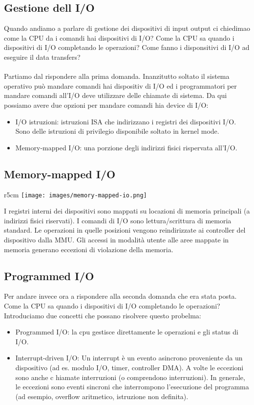 \subsection{Gestione dell I/O}
Quando andiamo a parlare di gestione dei dispositivi di input output ci chiedimao come la CPU da i comandi 
hai dispositivi di I/O? Come la CPU sa quando i dispositivi di I/O completando le operazioni? Come fanno i 
disponsitivi di I/O ad eseguire il data transfers?\\\\
Partiamo dal rispondere alla prima domanda. Inanzitutto soltato il sistema operativo può mandare comandi hai dispositiv
di I/O ed i programmatori per mandare comandi all'I/O deve utilizzare delle chiamate di sistema. Da qui possiamo avere
due opzioni per mandare comandi hia device di I/O:
\begin{itemize}
    \item I/O istruzioni: istruzioni ISA che indirizzano i registri dei dispositivi I/O. Sono delle istruzioni di privilegio disponibile soltato in kernel mode.
    \item Memory-mapped I/O: una porzione degli indirizzi fisici rispervata all'I/O.
\end{itemize}

\subsection{Memory-mapped I/O}
\begin{wrapfigure}{r}{5cm}
    \vspace{-20pt}
    \centering
    \texttt{[image: images/memory-mapped-io.png]}
\end{wrapfigure}
I registri interni dei dispositivi sono mappati su locazioni di memoria principali (a indirizzi fisici riservati). 
I comandi di I/O sono lettura/scrittura di memoria standard. Le operazioni in quelle posizioni vengono reindirizzate ai controller del dispositivo dalla MMU. 
Gli accessi in modalità utente alle aree mappate in memoria generano eccezioni di violazione della memoria.

\subsection{Programmed I/O}
Per andare invece ora a rispondere alla seconda domanda che era stata posta. Come la CPU sa quando i dispositivi di I/O completando le operazioni?
Introduciamo due concetti che possano risolvere questo probelma:
\begin{itemize}
    \item Programmed I/O: la cpu gestisce direttamente le operazioni e gli status di I/O.
    \item Interrupt-driven I/O: Un interrupt è un evento asincrono proveniente da un dispositivo (ad es. modulo I/O, timer, controller DMA). A volte le eccezioni sono anche c
    hiamate interruzioni (o comprendono interruzioni). In generale, le eccezioni sono eventi sincroni che interrompono l'esecuzione del programma (ad esempio, overflow aritmetico, istruzione non definita).
\end{itemize}

